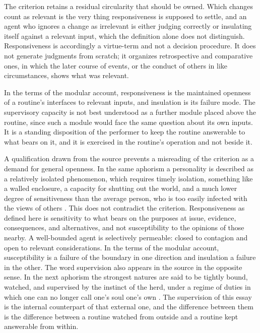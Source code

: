 \documentclass[11pt]{article}
\begin{document}
The criterion retains a residual circularity that should be owned. Which changes count as relevant is the very thing responsiveness is supposed to settle, and an agent who ignores a change as irrelevant is either judging correctly or insulating itself against a relevant input, which the definition alone does not distinguish. Responsiveness is accordingly a virtue-term and not a decision procedure. It does not generate judgments from scratch; it organizes retrospective and comparative ones, in which the later course of events, or the conduct of others in like circumstances, shows what was relevant.

In the terms of the modular account, responsiveness is the maintained openness of a routine's interfaces to relevant inputs, and insulation is its failure mode. The supervisory capacity is not best understood as a further module placed above the routine, since such a module would face the same question about its own inputs. It is a standing disposition of the performer to keep the routine answerable to what bears on it, and it is exercised in the routine's operation and not beside it.

A qualification drawn from the source prevents a misreading of the criterion as a demand for general openness. In the same aphorism a personality is described as a relatively isolated phenomenon, which requires timely isolation, something like a walled enclosure, a capacity for shutting out the world, and a much lower degree of sensitiveness than the average person, who is too easily infected with the views of others \cite[Aph.\ 886(c)]{wtp2}. This does not contradict the criterion. Responsiveness as defined here is sensitivity to what bears on the purposes at issue, evidence, consequences, and alternatives, and not susceptibility to the opinions of those nearby. A well-bounded agent is selectively permeable: closed to contagion and open to relevant considerations. In the terms of the modular account, susceptibility is a failure of the boundary in one direction and insulation a failure in the other. The word supervision also appears in the source in the opposite sense. In the next aphorism the strongest natures are said to be tightly bound, watched, and supervised by the instinct of the herd, under a regime of duties in which one can no longer call one's soul one's own \cite[Aph.\ 887]{wtp2}. The supervision of this essay is the internal counterpart of that external one, and the difference between them is the difference between a routine watched from outside and a routine kept answerable from within.
\end{document}
